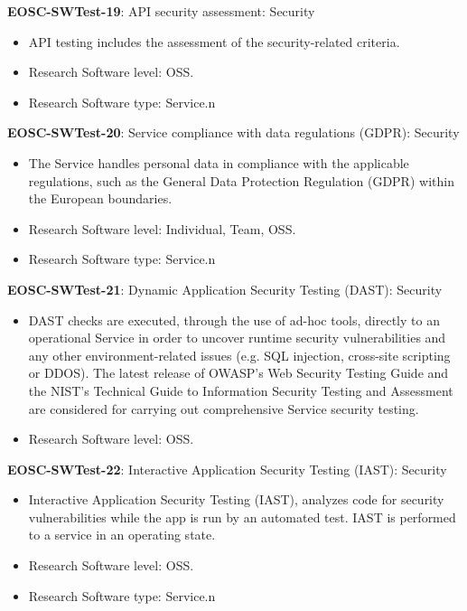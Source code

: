 \textbf{EOSC-SWTest-19}: API security assessment: Security

\begin{itemize}
    \item API testing includes the assessment of the security-related criteria. \cite{orviz_fernandez_eosc-synergy_2020}
    \item Research Software level: OSS.
    \item Research Software type: Service.n\end{itemize}

\textbf{EOSC-SWTest-20}: Service compliance with data regulations (GDPR): Security

\begin{itemize}
    \item The Service handles personal data in compliance with the applicable regulations, such as the General Data Protection Regulation (GDPR) within the European boundaries. \cite{orviz_fernandez_eosc-synergy_2020}
    \item Research Software level: Individual, Team, OSS.
    \item Research Software type: Service.n\end{itemize}

\textbf{EOSC-SWTest-21}: Dynamic Application Security Testing (DAST): Security

\begin{itemize}
    \item DAST checks are executed, through the use of ad-hoc tools, directly to an operational Service in order to uncover runtime security vulnerabilities and any other environment-related issues (e.g. SQL injection, cross-site scripting or DDOS). The latest release of OWASP's Web Security Testing Guide and the NIST's Technical Guide to Information Security Testing and Assessment are considered for carrying out comprehensive Service security testing. \cite{orviz_fernandez_eosc-synergy_2020}
    \item Research Software level: OSS.
\end{itemize}

\textbf{EOSC-SWTest-22}: Interactive Application Security Testing (IAST): Security

\begin{itemize}
    \item Interactive Application Security Testing (IAST), analyzes code for security vulnerabilities while the app is run by an automated test. IAST is performed to a service in an operating state. \cite{orviz_fernandez_eosc-synergy_2020}
    \item Research Software level: OSS.
    \item Research Software type: Service.n\end{itemize}

